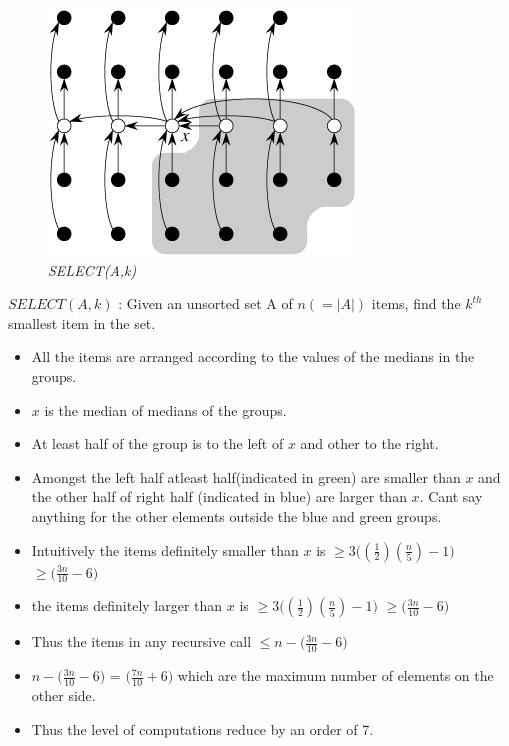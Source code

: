 \documentclass[11pt]{article}
\begin{document}
\begin{figure}[h!]  
\includegraphics[width=0.9\linewidth]{Median.jpg}
\caption{\small \sl SELECT(A,k) \label{fig:DeterministicSelect}}
\end{figure}
$SELECT(A,k)$ : Given an unsorted set A of $n(=|A|)$ items, find the $k^{th}$ smallest item in the set.

\begin{itemize}
\item All the items are arranged according to the values of the medians in the groups.
\item $x$ is the median of medians of the groups.
\item At least half of the group is to the left of $x$ and other to the right.
\item Amongst the left half atleast half(indicated in green) are smaller than $x$ and the other half of right half (indicated in blue) are larger than $x$. Cant say anything for the other elements outside the blue and green groups.
\item Intuitively the items definitely smaller than $x$ is $ \geq 3 \biggl((\frac{1}{2}) (\frac{n}{5}) - 1 \biggr)$ $ \geq \biggl(\frac{3n}{10} - 6 \biggr)$
\item the items definitely larger than $x$ is $ \geq 3 \biggl((\frac{1}{2}) (\frac{n}{5}) - 1 \biggr)$ $ \geq \biggl(\frac{3n}{10} - 6 \biggr)$
\item Thus the items in any recursive call $ \leq n - \biggl(\frac{3n}{10} - 6\biggr) $
\item $  n - \biggl(\frac{3n}{10} - 6\biggr) $ = $ \biggl(\frac{7n}{10} + 6\biggr) $ which are the maximum number of elements on the other side. 
\item Thus the level of computations reduce by an order of 7.
\end{itemize}
\end{document}
